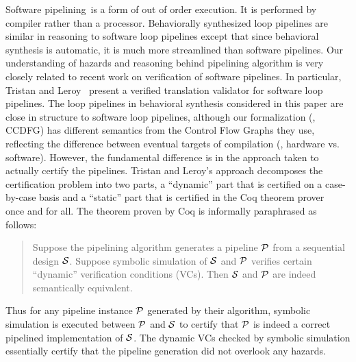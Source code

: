 Software pipelining~\cite{Leviathan:2002,Kundu:2009}is a form of out of order execution. It is performed by compiler rather than a processor. 
Behaviorally synthesized loop pipelines are similar in reasoning to software loop pipelines except that since
behavioral synthesis is automatic, it is much more streamlined than software pipelines. 
Our understanding of hazards and reasoning behind pipelining algorithm 
is very closely related to recent work on
verification of software pipelines.  In particular, Tristan
and Leroy~\cite{tl:software-popl10} present a verified
translation validator for software loop pipelines.  The loop
pipelines in behavioral synthesis considered in this paper
are close in structure to software loop pipelines, although
our formalization (\eg, CCDFG) has different semantics from
the Control Flow Graphs they use, reflecting the difference
between eventual targets of compilation (\viz, hardware
vs. software).  However, the fundamental difference is in
the approach taken to actually certify the pipelines.
Tristan and Leroy's approach decomposes the certification
problem into two parts, a ``dynamic'' part that is certified
on a case-by-case basis  and a ``static'' part that is
certified in the Coq theorem prover~\cite{coq} once and for all.  The
theorem proven by Coq is informally paraphrased as follows:

\begin{quote}
Suppose the pipelining algorithm generates a pipeline
${\cal{P}}$ from a sequential design ${\cal{S}}$.  Suppose
symbolic simulation of ${\cal{S}}$ and ${\cal{P}}$ verifies
certain ``dynamic'' verification conditions (VCs).  Then
${\cal{S}}$ and ${\cal{P}}$ are indeed semantically
equivalent.
\end{quote}

\noindent
Thus for any pipeline instance ${\cal{P}}$ generated by
their algorithm, symbolic simulation is executed between
${\cal{P}}$ and ${\cal{S}}$ to certify that ${\cal{P}}$ is
indeed a correct pipelined implementation of ${\cal{S}}$.
The dynamic VCs checked by symbolic simulation essentially
certify that the pipeline generation did not overlook any
hazards.

